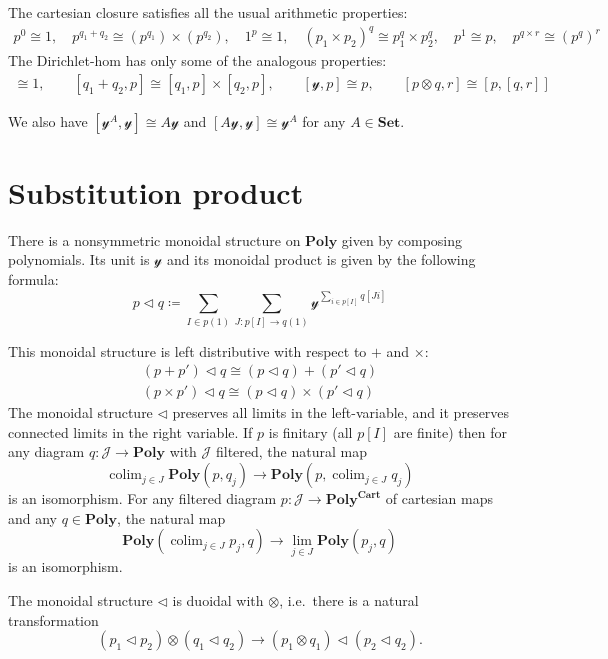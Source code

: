 \documentclass[11pt, one side, article]{memoir}
\theoremstyle{definition}
\theoremstyle{plain}
\DeclareMathOperator*{\colim}{colim}
\newcommand{\cat}[1]{\mathcal{#1}}%
\newcommand{\Cat}[1]{\mathbf{#1}}%
\newcommand{\too}{\longrightarrow}
\newcommand{\smset}{\Cat{Set}}
\newcommand{\yon}{\mathcal{y}}
\newcommand{\poly}{\Cat{Poly}}
\newcommand{\polycart}{\poly^{\Cat{Cart}}}
\newcommand{\0}{\textsf{0}}
\newcommand{\1}{\tn{\textsf{1}}}
\newcommand{\tri}{\mathbin{\triangleleft}}
\begin{document}
The cartesian closure satisfies all the usual arithmetic properties:
\begin{gather}
	p^0\cong1,\quad
	p^{q_1+q_2}\cong (p^{q_1})\times(p^{q_2}),\quad
	1^p\cong 1,\quad
	(p_1\times p_2)^q\cong p_1^q\times p_2^q,\quad
	p^1\cong p,\quad
	p^{q\times r}\cong (p^q)^r
\end{gather}
The Dirichlet-hom has only some of the analogous properties:
\begin{gather}
	[0,p]\cong1,\qquad
	[q_1+q_2,p]\cong [q_1,p]\times[q_2,p],\qquad
	[\yon,p]\cong p,\qquad
	[p\otimes q,r]\cong[p,[q,r]]
\end{gather}

We also have $[\yon^A,\yon]\cong A\yon$ and $[A\yon,\yon]\cong\yon^A$ for any $A\in\smset$.


\chapter{Substitution product}

There is a nonsymmetric monoidal structure on $\poly$ given by composing polynomials. Its unit is $\yon$ and its monoidal product is given by the following formula:
\begin{equation}
p\tri q\coloneqq\sum_{I\in p(1)}\sum_{J\colon p[I]\to q(1)}\yon^{\sum\limits_{i\in p[I]}q[Ji]}
\end{equation}

This monoidal structure is left distributive with respect to $+$ and $\times$:
\begin{align*}
	(p+p')\tri q\cong (p\tri q)+(p'\tri q)\\
	(p\times p')\tri q\cong (p\tri q)\times(p'\tri q)
\end{align*}
The monoidal structure $\tri$ preserves all limits in the left-variable, and it preserves connected limits in the right variable. If $p$ is finitary (all $p[I]$ are finite) then for any diagram $q\colon \cat{J}\to\poly$ with $\cat{J}$ filtered, the natural map
\begin{equation}
\colim_{j\in J}\poly(p,q_j)\to\poly(p,\colim_{j\in J}q_j)
\end{equation}
is an isomorphism. For any filtered diagram $p\colon\cat{J}\to\polycart$ of cartesian maps and any $q\in\poly$, the natural map
\begin{equation}
\poly(\colim_{j\in J}p_j,q)\to\lim_{j\in J}\poly(p_j,q)
\end{equation}
is an isomorphism.

The monoidal structure $\tri$ is duoidal with $\otimes$, i.e.\ there is a natural transformation
\begin{equation}
	(p_1\tri p_2)\otimes(q_1\tri q_2)\too(p_1\otimes q_1)\tri(p_2\tri q_2).
\end{equation}
\end{document}
